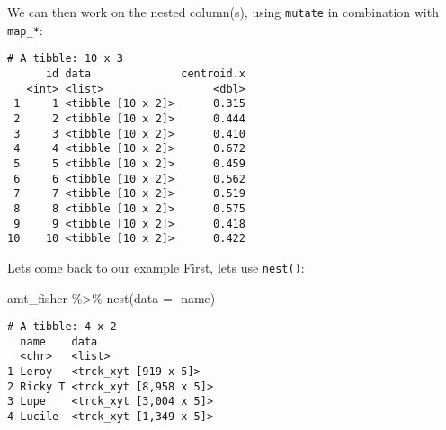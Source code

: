 \documentclass[ignorenonframetext,,t]{beamer}
\newenvironment{Shaded}{\begin{snugshade}}{\end{snugshade}}
\newcommand{\AttributeTok}[1]{\textcolor[rgb]{0.77,0.63,0.00}{#1}}
\newcommand{\FunctionTok}[1]{\textcolor[rgb]{0.00,0.00,0.00}{#1}}
\newcommand{\NormalTok}[1]{#1}
\newcommand{\SpecialCharTok}[1]{\textcolor[rgb]{0.00,0.00,0.00}{#1}}
\begin{document}
\begin{frame}[fragile]
We can then work on the nested column(s), using \texttt{mutate} in
combination with \texttt{map\_*}:

\begin{Shaded}
\end{Shaded}

\begin{verbatim}
# A tibble: 10 x 3
      id data              centroid.x
   <int> <list>                 <dbl>
 1     1 <tibble [10 x 2]>      0.315
 2     2 <tibble [10 x 2]>      0.444
 3     3 <tibble [10 x 2]>      0.410
 4     4 <tibble [10 x 2]>      0.672
 5     5 <tibble [10 x 2]>      0.459
 6     6 <tibble [10 x 2]>      0.562
 7     7 <tibble [10 x 2]>      0.519
 8     8 <tibble [10 x 2]>      0.575
 9     9 <tibble [10 x 2]>      0.418
10    10 <tibble [10 x 2]>      0.422
\end{verbatim}
\end{frame}

\begin{frame}[fragile]
\begin{block}{Lets come back to our example}
\protect\hypertarget{lets-come-back-to-our-example}{}
First, lets use \texttt{nest()}:

\begin{Shaded}
\begin{Highlighting}[]
\NormalTok{amt\_fisher }\SpecialCharTok{\%\textgreater{}\%} \FunctionTok{nest}\NormalTok{(}\AttributeTok{data =} \SpecialCharTok{{-}}\NormalTok{name)}
\end{Highlighting}
\end{Shaded}

\begin{verbatim}
# A tibble: 4 x 2
  name    data                  
  <chr>   <list>                
1 Leroy   <trck_xyt [919 x 5]>  
2 Ricky T <trck_xyt [8,958 x 5]>
3 Lupe    <trck_xyt [3,004 x 5]>
4 Lucile  <trck_xyt [1,349 x 5]>
\end{verbatim}
\end{block}
\end{frame}
\end{document}
